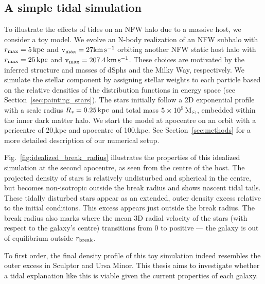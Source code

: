 \subsection{A simple tidal simulation}\label{a-simple-tidal-simulation}

To illustrate the effects of tides on an NFW halo due to a massive host,
we consider a toy model. We evolve an N-body realization of an NFW
subhalo with \(r_{\rm max}=5\,{\rm kpc}\) and \({\rm v}_{\rm max} = 27{\rm km\,s^{-1}}\) orbiting another
NFW static host halo with \(r_{\rm max}=25\,{\rm kpc}\) and
\({\rm v}_{\rm max} = 207.4\,{\rm km\,s^{-1}}\). These choices are motivated by the inferred
structure and masses of dSphs and the Milky Way, respectively. We
simulate the stellar component by assigning stellar weights to each
particle based on the relative densities of the distribution functions
in energy space (see Section~\ref{sec:painting_stars}). The stars
initially follow a 2D exponential profile with a scale radius
\(R_s=0.25\,{\rm kpc}\) and total mass \(5\times10^5\,{\rm M}_{\odot}\), embedded within
the inner dark matter halo. We start the model at apocentre on an orbit
with a pericentre of 20,kpc and apocentre of 100,kpc. See
Section~\ref{sec:methods} for a more detailed description of our
numerical setup.

Fig.~\ref{fig:idealized_break_radius} illustrates the properties of this
idealized simulation at the second apocentre, as seen from the centre of
the host. The projected density of stars is relatively undisturbed and
spherical in the centre, but becomes non-isotropic outside the break
radius and shows nascent tidal tails. These tidally disturbed stars
appear as an extended, outer density excess relative to the initial
conditions. This excess appears just outside the break radius. The break
radius also marks where the mean 3D radial velocity of the stars (with
respect to the galaxy's centre) transitions from 0 to positive --- the
galaxy is out of equilibrium outside \(r_{\rm break}\).

To first order, the final density profile of this toy simulation indeed
resembles the outer excess in Sculptor and Ursa Minor. This thesis aims
to investigate whether a tidal explanation like this is viable given the
current properties of each galaxy.

